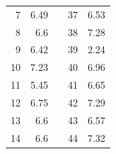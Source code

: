 \begin{table}[H]
\begin{tabular}{|r|r|l|r|r|}
  7                                                         & 6.49                                                      &  & 37                                                                              & 6.53                                                                             \\ \cline{1-2} \cline{4-5} 
  8                                                         & 6.6                                                       &  & 38                                                                              & 7.28                                                                             \\ \cline{1-2} \cline{4-5} 
  9                                                         & 6.42                                                      &  & 39                                                                              & 2.24                                                                             \\ \cline{1-2} \cline{4-5} 
  10                                                        & 7.23                                                      &  & 40                                                                              & 6.96                                                                             \\ \cline{1-2} \cline{4-5} 
  11                                                        & 5.45                                                      &  & 41                                                                              & 6.65                                                                             \\ \cline{1-2} \cline{4-5} 
  12                                                        & 6.75                                                      &  & 42                                                                              & 7.29                                                                             \\ \cline{1-2} \cline{4-5} 
  13                                                        & 6.6                                                       &  & 43                                                                              & 6.57                                                                             \\ \cline{1-2} \cline{4-5} 
  14                                                        & 6.6                                                       &  & 44                                                                              & 7.32                                                                             \\ \cline{1-2} \cline{4-5} 

\end{tabular}
\end{table}
